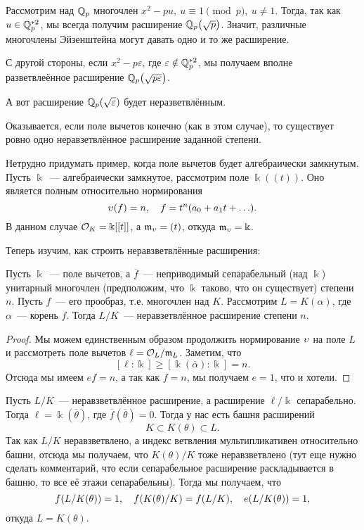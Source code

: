 	 \begin{example}
	 	Рассмотрим над $\mathbb{Q}_{p}$ многочлен $x^2 - pu, \ u \equiv 1 \pmod{p}, \ u \neq 1$. Тогда, так как $u \in \mathbb{Q}_{p}^{*2}$, мы всегда получим расширение $\Q_{p}\lr*{\sqrt{p}}$. Значит, различные многочлены Эйзенштейна могут давать одно и то же расширение.  

	 	С другой стороны, если $x^2 - p \varepsilon	$, где $\varepsilon \notin \mathbb{Q}_{p}^{*2}$, мы получаем вполне разветвлеённое расширение $\Q_{p}\lr*{\sqrt{p \varepsilon}}$. 

	 	А вот расширение $\Q_{p}\lr*{\sqrt{\varepsilon}}$ будет неразветвлённым.

	 	Оказывается, если поле вычетов конечно (как в этом случае), то существует ровно одно неравзетвлённое расширение заданной степени. 
	 \end{example}

	 \begin{example}
	 	Нетрудно придумать пример, когда поле вычетов будет алгебраически замкнутым. Пусть $\Bbbk$~--- алгебраически замкнутое, рассмотрим поле $\Bbbk((t))$. Оно является полным относительно нормирования 
	 	\[
	 		\upsilon(f) = n, \quad f = t^n (a_0 + a_1 t + \ldots ).
	 	\]
	 	В данном случае $\mathcal{O}_{K} = \Bbbk[[t]]$, а $\mathfrak{m}_{\upsilon} = (t)$, откуда $\mathfrak{m}_{\upsilon} = \Bbbk$. 
	 \end{example}

	 Теперь изучим, как строить неравзветвлённые расширения: 

	 \begin{statement} 
			 Пусть $\Bbbk$~--- поле вычетов, а $\overline{f}$~--- неприводимый сепарабельный (над $\Bbbk$) унитарный многочлен (предположим, что $\Bbbk$ таково, что он существует) степени $n$. Пусть $f$~--- его прообраз, т.е. многочлен над $K$.  Рассмотрим $L = K(\alpha)$, где $\alpha$~--- корень $f$.  Тогда $L/K$~--- неравзетвлённое расширение степени $n$.	
	 \end{statement}
	 \begin{proof}
	 	Мы можем единственным образом продолжить нормирование $\upsilon$ на поле $L$ и рассмотреть поле вычетов $\ell = \mathcal{O}_{L}/\mathfrak{m}_{L}$. Заметим, что 
	 	\[
	 		[\ell : \Bbbk] \ge [\Bbbk(\overline{\alpha}) : \Bbbk] = n.
	 	\]
	 	Отсюда мы имеем $ef = n$, а так как $f = n$, мы получаем $e = 1$, что и хотели. 
	 \end{proof}

	 Пусть $L/K$~--- неравзветвлённое расширение, а расширение $\ell/\Bbbk$ сепарабельно. Тогда $\ell = \Bbbk(\overline{\theta})$, где $\overline{f}(\overline{\theta}) = 0$. Тогда у нас есть башня расширений 
	 \[
	 	K \subset K(\theta) \subset L.
	 \]
	 Так как $L/K$ неравзветвлено, а индекс ветвления мультипликативен относительно башни, отсюда мы получаем, что $K(\theta)/K$ тоже неравзветвлено (тут еще нужно сделать комментарий, что если сепарабельное расширение раскладывается в башню, то все её этажи сепарабельны).  Тогда мы получаем, что 
	 \[
	 	f\lr*{L/K(\theta)} = 1, \quad f\lr*{K(\theta)/K} = f\lr*{L/K}, \quad e\lr*{L/K(\theta)} = 1,
	 \]
	 откуда $L = K(\theta)$.

